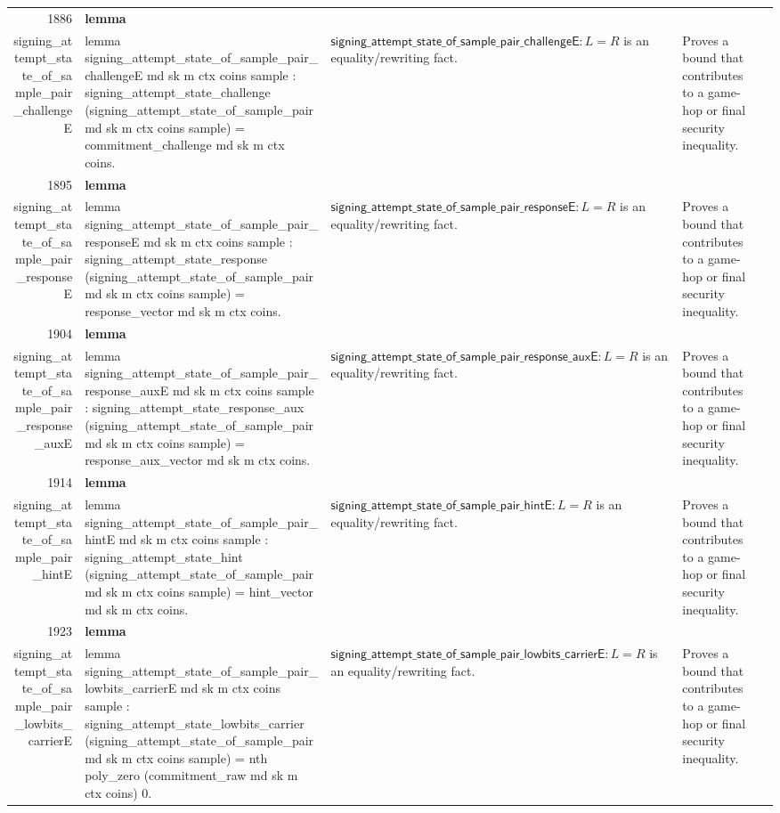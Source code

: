 \documentclass[10pt]{article}
\newcommand{\ec}[1]{\begingroup\ttfamily\scriptsize #1\endgroup}
\begin{document}
\begin{longtable}{r L{0.17\textwidth} L{0.26\textwidth} L{0.27\textwidth} L{0.20\textwidth}}
1886 & \textbf{lemma}\\\ec{signing\_attempt\_state\_of\_sample\_pair\_challengeE} & \ec{lemma signing\_attempt\_state\_of\_sample\_pair\_challengeE md sk m ctx coins sample : signing\_attempt\_state\_challenge (signing\_attempt\_state\_of\_sample\_pair md sk m ctx coins sample) = commitment\_challenge md sk m ctx coins.} & \(\mathsf{signing\_attempt\_state\_of\_sample\_pair\_challengeE} : L = R\) is an equality/rewriting fact. & Proves a bound that contributes to a game-hop or final security inequality. \\
1895 & \textbf{lemma}\\\ec{signing\_attempt\_state\_of\_sample\_pair\_responseE} & \ec{lemma signing\_attempt\_state\_of\_sample\_pair\_responseE md sk m ctx coins sample : signing\_attempt\_state\_response (signing\_attempt\_state\_of\_sample\_pair md sk m ctx coins sample) = response\_vector md sk m ctx coins.} & \(\mathsf{signing\_attempt\_state\_of\_sample\_pair\_responseE} : L = R\) is an equality/rewriting fact. & Proves a bound that contributes to a game-hop or final security inequality. \\
1904 & \textbf{lemma}\\\ec{signing\_attempt\_state\_of\_sample\_pair\_response\_auxE} & \ec{lemma signing\_attempt\_state\_of\_sample\_pair\_response\_auxE md sk m ctx coins sample : signing\_attempt\_state\_response\_aux (signing\_attempt\_state\_of\_sample\_pair md sk m ctx coins sample) = response\_aux\_vector md sk m ctx coins.} & \(\mathsf{signing\_attempt\_state\_of\_sample\_pair\_response\_auxE} : L = R\) is an equality/rewriting fact. & Proves a bound that contributes to a game-hop or final security inequality. \\
1914 & \textbf{lemma}\\\ec{signing\_attempt\_state\_of\_sample\_pair\_hintE} & \ec{lemma signing\_attempt\_state\_of\_sample\_pair\_hintE md sk m ctx coins sample : signing\_attempt\_state\_hint (signing\_attempt\_state\_of\_sample\_pair md sk m ctx coins sample) = hint\_vector md sk m ctx coins.} & \(\mathsf{signing\_attempt\_state\_of\_sample\_pair\_hintE} : L = R\) is an equality/rewriting fact. & Proves a bound that contributes to a game-hop or final security inequality. \\
1923 & \textbf{lemma}\\\ec{signing\_attempt\_state\_of\_sample\_pair\_lowbits\_carrierE} & \ec{lemma signing\_attempt\_state\_of\_sample\_pair\_lowbits\_carrierE md sk m ctx coins sample : signing\_attempt\_state\_lowbits\_carrier (signing\_attempt\_state\_of\_sample\_pair md sk m ctx coins sample) = nth poly\_zero (commitment\_raw md sk m ctx coins) 0.} & \(\mathsf{signing\_attempt\_state\_of\_sample\_pair\_lowbits\_carrierE} : L = R\) is an equality/rewriting fact. & Proves a bound that contributes to a game-hop or final security inequality. \\

\end{longtable}
\end{document}
